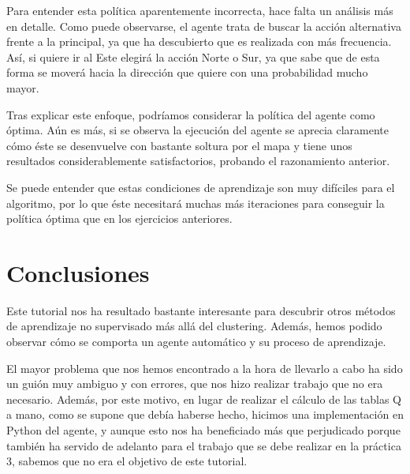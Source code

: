 \documentclass[12pt]{article}
\begin{document}
Para entender esta política aparentemente incorrecta, hace falta un análisis más en detalle. Como puede observarse, el agente trata de buscar la acción alternativa frente a la principal, ya que ha descubierto que es realizada con más frecuencia. Así, si quiere ir al Este elegirá la acción Norte o Sur, ya que sabe que de esta forma se moverá hacia la dirección que quiere con una probabilidad mucho mayor.

Tras explicar este enfoque, podríamos considerar la política del agente como óptima. Aún es más, si se observa la ejecución del agente se aprecia claramente cómo éste se desenvuelve con bastante soltura por el mapa y tiene unos resultados considerablemente satisfactorios, probando el razonamiento anterior.

Se puede entender que estas condiciones de aprendizaje son muy difíciles para el algoritmo, por lo que éste necesitará muchas más iteraciones para conseguir la política óptima que en los ejercicios anteriores.

\newpage
\section{Conclusiones}
Este tutorial nos ha resultado bastante interesante para descubrir otros métodos de aprendizaje no supervisado más allá del clustering. Además, hemos podido observar cómo se comporta un agente automático y su proceso de aprendizaje.

El mayor problema que nos hemos encontrado a la hora de llevarlo a cabo ha sido un guión muy ambiguo y con errores, que nos hizo realizar trabajo que no era necesario. Además, por este motivo, en lugar de realizar el cálculo de las tablas Q a mano, como se supone que debía haberse hecho, hicimos una implementación en Python del agente, y aunque esto nos ha beneficiado más que perjudicado porque también ha servido de adelanto para el trabajo que se debe realizar en la práctica 3, sabemos que no era el objetivo de este tutorial.
\end{document}
